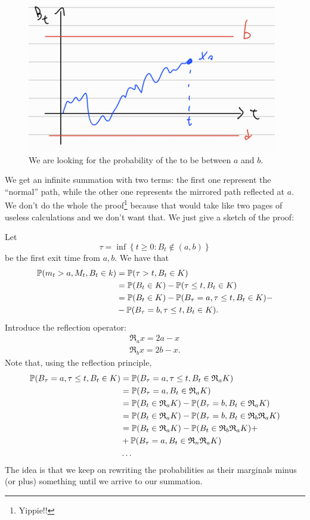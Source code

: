 \documentclass[12pt]{report}
\begin{document}
\begin{figure}[h]
	\centering
	\includegraphics[width=0.5\linewidth]{img/screenshot031}
	\caption{We are looking for the probability of the \bwm{} to be between $a$ and $b$.}
	\label{fig:screenshot031}
\end{figure}
We get an infinite summation with two terms: the first one represent the ``normal'' path, while the other one represents the mirrored path reflected at $a$. We don't do the whole the proof\footnote{Yippie!!} because that would take like two pages of useless calculations and we don't want that. We just give a sketch of the proof:
\begin{fancyproof}
	Let 
	\begin{equation*}
		\tau=\inf\left\{t\geq0:B_{t}\notin(a,b)\right\}
	\end{equation*}
	be the first exit time from $a,b$. We have that 
	\begin{align*}
		\mathbb{P}(m_{t}>a,M_{t},B_{t}\in k)&=\mathbb{P}(\tau>t,B_{t}\in K)\\
		&=\mathbb{P}(B_{t}\in K)-\mathbb{P}(\tau\leq t,B_{t}\in K)\\
		&=\mathbb{P}(B_{t}\in K)-\mathbb{P}(B_{\tau}=a,\tau\leq t,B_{t}\in K)-\\
		&-\mathbb{P}(B_{\tau}=b,\tau\leq t,B_{t}\in K).
	\end{align*}
	Introduce the reflection operator:
	\begin{equation*}
		\begin{array}{c}
			\mathfrak{R}_{a}x=2a-x\\
			\mathfrak{R}_{b}x=2b-x.
		\end{array}
	\end{equation*}
	Note that, using the reflection principle,
	\begin{align*}
		\mathbb{P}(B_{\tau}=a,\tau\leq t,B_{t}\in K)&=\mathbb{P}(B_{\tau}=a,\tau\leq t,B_{t}\in\mathfrak{R}_{a}K)\\
		&=\mathbb{P}(B_{\tau}=a,B_{t}\in\mathfrak{R}_{a}K)\\
		&=\mathbb{P}(B_{t}\in\mathfrak{R}_{a}K)-\mathbb{P}(B_{\tau}=b,B_{t}\in\mathfrak{R}_{a}K)\\
		&=\mathbb{P}(B_{t}\in\mathfrak{R}_{a}K)-\mathbb{P}(B_{\tau}=b,B_{t}\in\mathfrak{R}_{b}\mathfrak{R}_{a}K)\\
		&=\mathbb{P}(B_{t}\in\mathfrak{R}_{a}K)-\mathbb{P}(B_{t}\in\mathfrak{R}_{b}\mathfrak{R}_{a}K)+\\
		&+\mathbb{P}(B_{\tau}=a,B_{t}\in\mathfrak{R}_{n}\mathfrak{R}_{a}K)\\
		&\ldots
	\end{align*}
	The idea is that we keep on rewriting the probabilities as their marginals minus (or plus) something until we arrive to our summation.
\end{fancyproof}
\end{document}
